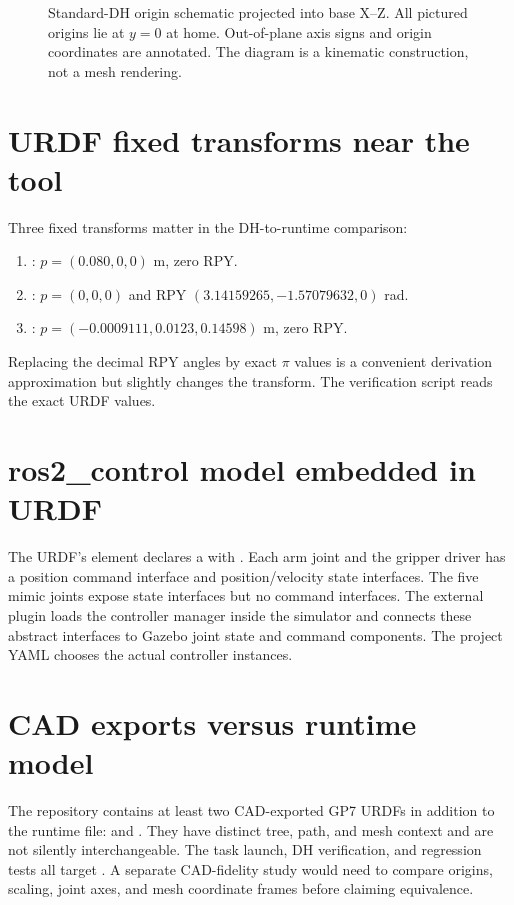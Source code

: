 \begin{figure}[htbp]
\centering
\caption{Standard-DH origin schematic projected into base X--Z. All pictured
origins lie at $y=0$ at home. Out-of-plane axis signs and origin coordinates
are annotated. The diagram is a kinematic construction, not a mesh rendering.}
\label{fig:dh-frames}
\end{figure}

\section{URDF fixed transforms near the tool}
Three fixed transforms matter in the DH-to-runtime comparison:
\begin{enumerate}
 \item {}: $p=(0.080,0,0)$ m, zero RPY.
 \item {}: $p=(0,0,0)$ and RPY
 $(3.14159265,-1.57079632,0)$ rad.
 \item {}: $p=(-0.0009111,0.0123,0.14598)$ m,
 zero RPY.
\end{enumerate}
Replacing the decimal RPY angles by exact $\pi$ values is a convenient
derivation approximation but slightly changes the transform. The verification
script reads the exact URDF values.

\section{ros2\_control model embedded in URDF}
The URDF's  element declares a  with
. Each arm joint and the gripper
driver has a position command interface and position/velocity state
interfaces. The five mimic joints expose state interfaces but no command
interfaces. The external plugin loads the controller manager inside the
simulator and connects these abstract interfaces to Gazebo joint state and
command components. The project YAML chooses the actual controller instances.

\section{CAD exports versus runtime model}
The repository contains at least two CAD-exported GP7 URDFs in addition to the
runtime file:  and
. They have distinct tree,
path, and mesh context and are not silently interchangeable. The task launch,
DH verification, and regression tests all target
. A separate CAD-fidelity study
would need to compare origins, scaling, joint axes, and mesh coordinate frames
before claiming equivalence.

